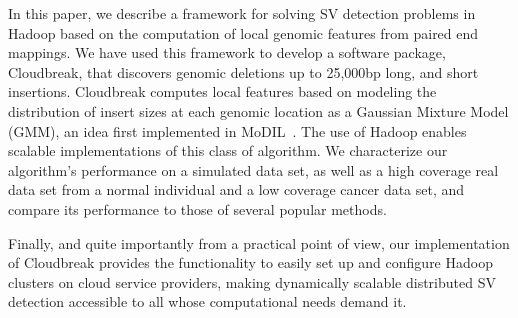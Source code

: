 \documentclass{bioinfo}
\begin{document}
In this paper, we describe a framework for solving SV detection problems in Hadoop based on the computation of local genomic features from paired end mappings. We have used this framework to develop a software package, Cloudbreak, that discovers genomic deletions up to 25,000bp long, and short insertions. Cloudbreak computes local features based on modeling the distribution of insert sizes at each genomic location as a Gaussian Mixture Model (GMM), an idea first implemented in MoDIL~\citep{Lee:2009da}. The use of Hadoop enables scalable implementations of this class of algorithm. We characterize our algorithm's performance on a simulated data set, as well as a high coverage real data set from a normal individual and a low coverage cancer data set, and compare its performance to those of several popular methods. 

Finally, and quite importantly from a practical point of view, our implementation of Cloudbreak provides the functionality to easily set up and configure Hadoop clusters on cloud service providers, making dynamically scalable distributed SV detection accessible to all whose computational needs demand it.

\end{document}
